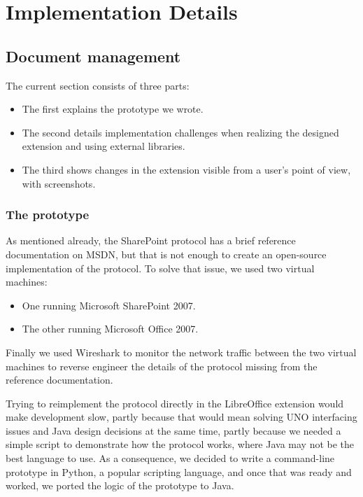 \chapter{Implementation Details}

\section{Document management}

The current section consists of three parts:

\begin{itemize}
\item The first explains the prototype we wrote.
\item The second details implementation challenges when realizing the designed extension and using external libraries.
\item The third shows changes in the extension visible from a user's point of view, with screenshots.
\end{itemize}

\subsection{The prototype}

As mentioned already, the SharePoint protocol has a brief reference
documentation on MSDN, but that is not enough to create an open-source
implementation of the protocol. To solve that issue, we used two virtual
machines:

\begin{itemize}
\item One running Microsoft SharePoint 2007.
\item The other running Microsoft Office 2007.
\end{itemize}

Finally we used Wireshark\cite{wireshark} to monitor the network traffic
between the two virtual machines to reverse engineer the details of the
protocol missing from the reference documentation.

Trying to reimplement the protocol directly in the LibreOffice extension would
make development slow, partly because that would mean solving UNO interfacing
issues and Java design decisions at the same time, partly because we needed a
simple script to demonstrate how the protocol works, where Java may not be the
best language to use. As a consequence, we decided to write a command-line
prototype in Python, a popular scripting language, and once that was ready and
worked, we ported the logic of the prototype to Java.

